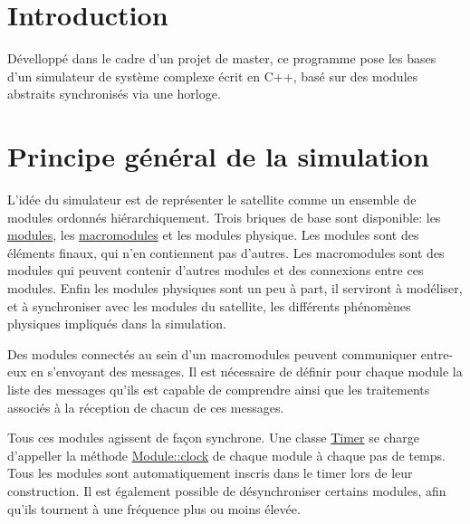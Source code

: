 \hypertarget{index_intro_sec}{}\section{Introduction}\label{index_intro_sec}
Dévelloppé dans le cadre d'un projet de master, ce programme pose les bases d'un simulateur de système complexe écrit en C++, basé sur des modules abstraits synchronisés via une horloge.\hypertarget{index_general}{}\section{Principe général de la simulation}\label{index_general}
L'idée du simulateur est de représenter le satellite comme un ensemble de modules ordonnés hiérarchiquement. Trois briques de base sont disponible\-: les \hyperlink{docModule}{modules}, les \hyperlink{docMacroModule}{macromodules} et les modules physique. Les modules sont des éléments finaux, qui n'en contiennent pas d'autres. Les macromodules sont des modules qui peuvent contenir d'autres modules et des connexions entre ces modules. Enfin les modules physiques sont un peu à part, il serviront à modéliser, et à synchroniser avec les modules du satellite, les différents phénomènes physiques impliqués dans la simulation.

Des modules connectés au sein d'un macromodules peuvent communiquer entre-\/eux en s'envoyant des messages. Il est nécessaire de définir pour chaque module la liste des messages qu'ils est capable de comprendre ainsi que les traitements associés à la réception de chacun de ces messages.

Tous ces modules agissent de façon synchrone. Une classe \hyperlink{classTimer}{Timer} se charge d'appeller la méthode \hyperlink{classModule_ab7ea9648fa500696c85e93ebd0666390}{Module\-::clock} de chaque module à chaque pas de temps. Tous les modules sont automatiquement inscris dans le timer lors de leur construction. Il est également possible de désynchroniser certains modules, afin qu'ils tournent à une fréquence plus ou moins élevée.

